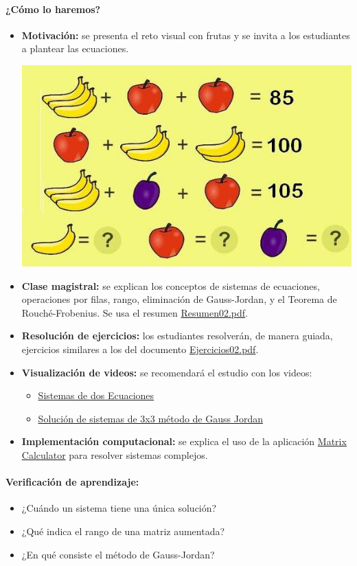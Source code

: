 \documentclass[a4,11pt]{aleph-notas}
\begin{document}
\paragraph{¿Cómo lo haremos?}  
\begin{itemize}[leftmargin=*]  
    \item \textbf{Motivación:} se presenta el reto visual con frutas y se invita a los estudiantes a plantear las ecuaciones. 
    \begin{center}
        \includegraphics[width=0.5\linewidth]{2-Clases/Figuras/sistema8bien.jpg}
    \end{center}
    \item \textbf{Clase magistral:} se explican los conceptos de sistemas de ecuaciones, operaciones por filas, rango, eliminación de Gauss-Jordan, y el Teorema de Rouché-Frobenius. Se usa el resumen \href{https://fcena-puce.github.io/AlgLinealyGeomAnalitica-05-N0068/2-Resumenes/Resumen02.pdf}{Resumen02.pdf}.  
    \item \textbf{Resolución de ejercicios:} los estudiantes resolverán, de manera guiada, ejercicios similares a los del documento \href{https://fcena-puce.github.io/AlgLinealyGeomAnalitica-05-N0068/2-Ejercicios/Ejercicios02.pdf}{Ejercicios02.pdf}.  
    \item \textbf{Visualización de videos:} se recomendará el estudio con los videos:  
    \begin{itemize}
        \item \href{https://www.youtube.com/watch?v=IF7WV5VVci4}{Sistemas de dos Ecuaciones}
        \item \href{https://www.youtube.com/watch?v=dFmGzr1j6eY}{Solución de sistemas de 3x3 método de Gauss Jordan}
    \end{itemize}  
    \item \textbf{Implementación computacional:} se explica el uso de la aplicación \href{https://matrixcalc.org/es/slu.html}{Matrix Calculator} para resolver sistemas complejos.
\end{itemize}  

\paragraph{Verificación de aprendizaje:}  
\begin{itemize}[leftmargin=*]  
    \item ¿Cuándo un sistema tiene una única solución?  
    \item ¿Qué indica el rango de una matriz aumentada?  
    \item ¿En qué consiste el método de Gauss-Jordan?  
\end{itemize}  
\end{document}
